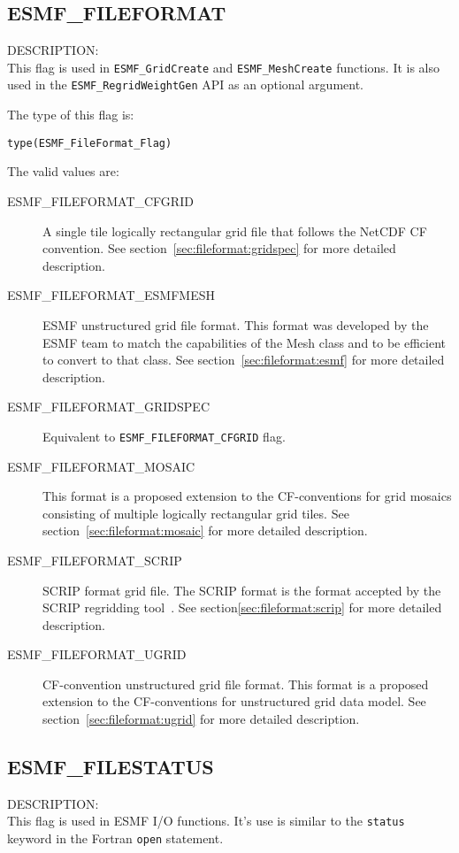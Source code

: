 \subsection{ESMF\_FILEFORMAT}
\label{const:fileformatflag}
{\sf DESCRIPTION:\\}
This flag is used in {\tt ESMF\_GridCreate} and {\tt ESMF\_MeshCreate}
functions.  It is also used in the {\tt ESMF\_RegridWeightGen} API as an
optional argument.

The type of this flag is:

{\tt type(ESMF\_FileFormat\_Flag)}

The valid values are:
\begin{description}
\item [ESMF\_FILEFORMAT\_CFGRID]  A single tile logically rectangular
  grid file that follows the NetCDF CF convention. See section~\ref{sec:fileformat:gridspec} for more detailed description.

\item [ESMF\_FILEFORMAT\_ESMFMESH] ESMF unstructured grid file format. This format was developed by the ESMF team to match the capabilities of the Mesh class and to be efficient to convert to that class. See section~\ref{sec:fileformat:esmf} for more detailed description.

\item [ESMF\_FILEFORMAT\_GRIDSPEC]  Equivalent to {\tt ESMF\_FILEFORMAT\_CFGRID} flag.  

\item [ESMF\_FILEFORMAT\_MOSAIC] This format is a proposed extension to the 
CF-conventions for grid mosaics consisting of multiple logically rectangular grid
tiles. See section~\ref{sec:fileformat:mosaic} for more detailed description.

\item [ESMF\_FILEFORMAT\_SCRIP] SCRIP format grid file. The SCRIP format is
  the format accepted by the SCRIP regridding tool~\cite{ref:SCRIP}.  See section\ref{sec:fileformat:scrip} for more detailed description.

\item [ESMF\_FILEFORMAT\_UGRID] CF-convention unstructured grid file format. This format is a proposed extension to the 
CF-conventions for unstructured grid data model. See section~\ref{sec:fileformat:ugrid} for more detailed description.

\end{description}

\subsection{ESMF\_FILESTATUS}
\label{const:filestatusflag}
{\sf DESCRIPTION:\\}
This flag is used in ESMF I/O functions. It's use is similar to the
{\tt status} keyword in the Fortran {\tt open} statement.


